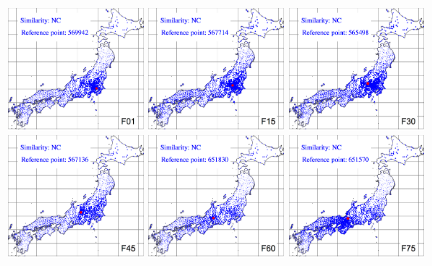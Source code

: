 \documentclass[output=paper]{LSP/langsci}
\begin{document}
\begin{figure}
\includegraphics[width=0.32\textwidth]{illustrations/kuma_fig21-F01}
\includegraphics[width=0.32\textwidth]{illustrations/kuma_fig21-F15}
\includegraphics[width=0.32\textwidth]{illustrations/kuma_fig21-F30}
\\
\includegraphics[width=0.32\textwidth]{illustrations/kuma_fig21-F45}
\includegraphics[width=0.32\textwidth]{illustrations/kuma_fig21-F60}
\includegraphics[width=0.32\textwidth]{illustrations/kuma_fig21-F75}

\end{figure}
\end{document}
